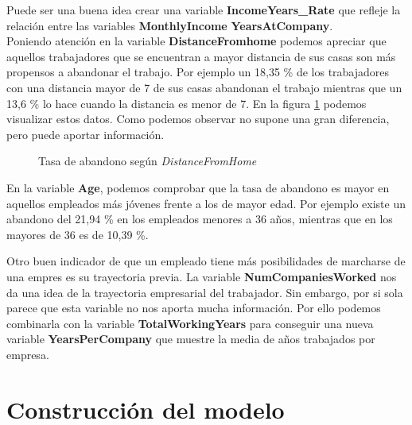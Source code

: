 Puede ser una buena idea crear una variable \textbf{IncomeYears\_Rate} que refleje la relación entre las variables \textbf{MonthlyIncome} \textbf{YearsAtCompany}.\\

Poniendo atención en la variable \textbf{DistanceFromhome} podemos apreciar que aquellos trabajadores que se encuentran a mayor distancia de sus casas son más propensos a abandonar el trabajo.
Por ejemplo un 18,35 \% de los trabajadores con una distancia mayor de 7 de sus casas abandonan el trabajo mientras que un 13,6 \% lo hace cuando la distancia es menor de 7. En la figura \ref{fig:attrition_distance} podemos visualizar estos datos. Como podemos observar no supone una gran diferencia, pero puede aportar información.\\


\begin{figure}
\centering
{}
\qquad
{}
\caption{Tasa de abandono según \textit{DistanceFromHome}}
\label{fig:attrition_distance}
\end{figure}


En la variable \textbf{Age}, podemos comprobar que la tasa de abandono es  mayor en aquellos empleados más jóvenes frente a los de mayor edad.
Por ejemplo existe un abandono del 21,94 \% en los empleados menores a 36 años, mientras que en los mayores de 36 es de 10,39 \%.

Otro buen indicador de que un empleado tiene más posibilidades de marcharse de una empres es su trayectoria previa. La variable \textbf{NumCompaniesWorked} nos da una idea de la trayectoria empresarial del trabajador.
Sin embargo, por si sola parece que esta variable no nos aporta mucha información. Por ello podemos combinarla con la variable \textbf{TotalWorkingYears} para conseguir una nueva variable \textbf{YearsPerCompany} que muestre la media de años trabajados por empresa.\\





\section{Construcción del modelo}



